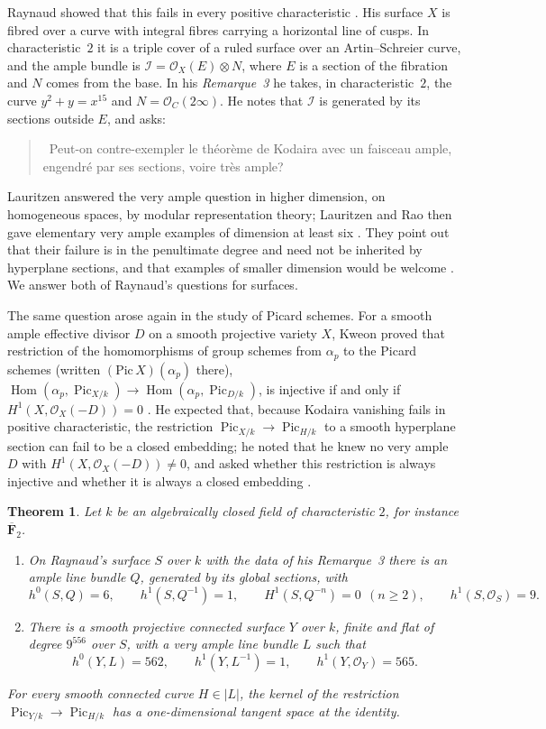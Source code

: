 \documentclass[11pt,a4paper]{article}
\theoremstyle{plain}
\newtheorem{theorem}{Theorem}
\theoremstyle{remark}
\newcommand{\OO}{\mathcal O}
\newcommand{\F}{\mathbf F}
\newcommand{\Pic}{\operatorname{Pic}}
\newcommand{\Hom}{\operatorname{Hom}}
\begin{document}
Raynaud showed that this fails in every positive characteristic \cite[p.~273]{Raynaud}. His surface $X$ is fibred over a
curve with integral fibres carrying a horizontal line of cusps. In characteristic~$2$ it is a triple cover of a ruled
surface over an Artin--Schreier curve, and the ample bundle is $\mathcal I=\OO_X(E)\otimes N$, where $E$ is a section of
the fibration and $N$ comes from the base. In his \emph{Remarque~3} \cite[p.~278]{Raynaud} he takes, in
characteristic~$2$, the curve $y^2+y=x^{15}$ and $N=\OO_C(2\infty)$. He notes that $\mathcal I$ is generated by its
sections outside $E$, and asks:
\begin{quote}
\guillemotleft\ Peut-on contre-exempler le th\'eor\`eme de Kodaira avec un faisceau ample, engendr\'e par ses
sections, voire tr\`es ample?\ \guillemotright
\end{quote}
Lauritzen answered the very ample question in higher dimension, on homogeneous spaces, by modular representation
theory; Lauritzen and Rao then gave elementary very ample examples of dimension at least six
\cite[pp.~1--2]{LauritzenRao}\cite{Lauritzen}. They point out that their failure is in the penultimate degree and need
not be inherited by hyperplane sections, and that examples of smaller dimension would be welcome
\cite[p.~2]{LauritzenRao}. We answer both of Raynaud's questions for surfaces.

The same question arose again in the study of Picard schemes. For a smooth ample effective divisor $D$ on a smooth
projective variety $X$, Kweon proved that restriction of the homomorphisms of group schemes from $\alpha_p$ to the Picard schemes
(written $(\mathrm{Pic}\,X)(\alpha_p)$ there),
$\Hom(\alpha_p,\Pic_{X/k})\to\Hom(\alpha_p,\Pic_{D/k})$, is injective if and only if $H^1(X,\OO_X(-D))=0$
\cite[Theorem~7.6, p.~18]{Kweon}. He expected that, because Kodaira vanishing fails in positive characteristic, the
restriction $\Pic_{X/k}\to\Pic_{H/k}$ to a smooth hyperplane section can fail to be a closed embedding; he noted that he
knew no very ample $D$ with $H^1(X,\OO_X(-D))\ne0$, and asked whether this restriction is always injective and whether it
is always a closed embedding \cite[pp.~18--19, Question~7.7]{Kweon}.

\begin{theorem}\label{thm:main}
Let $k$ be an algebraically closed field of characteristic $2$, for instance $\overline{\F}_2$.
\begin{enumerate}
\item[\textup{(a)}] On Raynaud's surface $S$ over $k$ with the data of his Remarque~3 there is an ample line bundle $Q$,
generated by its global sections, with
\[
 h^0(S,Q)=6,\qquad h^1(S,Q^{-1})=1,\qquad H^1(S,Q^{-n})=0\ \ (n\ge2),\qquad h^1(S,\OO_S)=9 .
\]
\item[\textup{(b)}] There is a smooth projective connected surface $Y$ over $k$, finite and flat of degree $9^{556}$ over
$S$, with a very ample line bundle $L$ such that
\[
 h^0(Y,L)=562,\qquad h^1(Y,L^{-1})=1,\qquad h^1(Y,\OO_Y)=565 .
\]
\end{enumerate}
For every smooth connected curve $H\in|L|$, the kernel of the restriction $\Pic_{Y/k}\to\Pic_{H/k}$ has a
one-dimensional tangent space at the identity.
\end{theorem}
\end{document}
